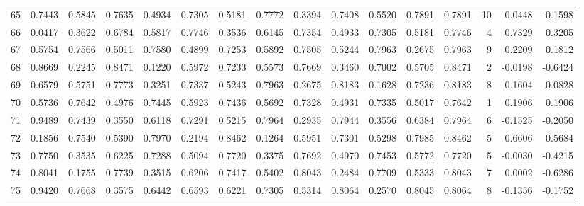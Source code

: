 \begin{tabular}{lrrrrrrrrrrrrrrr}
65  &      0.7443 &  0.5845 &  0.7635 &  0.4934 &  0.7305 &  0.5181 &  0.7772 &  0.3394 &  0.7408 &  0.5520 &   0.7891 &     0.7891 &     10 &                    0.0448 &                    -0.1598 \\
66  &      0.0417 &  0.3622 &  0.6784 &  0.5817 &  0.7746 &  0.3536 &  0.6145 &  0.7354 &  0.4933 &  0.7305 &   0.5181 &     0.7746 &      4 &                    0.7329 &                     0.3205 \\
67  &      0.5754 &  0.7566 &  0.5011 &  0.7580 &  0.4899 &  0.7253 &  0.5892 &  0.7505 &  0.5244 &  0.7963 &   0.2675 &     0.7963 &      9 &                    0.2209 &                     0.1812 \\
68  &      0.8669 &  0.2245 &  0.8471 &  0.1220 &  0.5972 &  0.7233 &  0.5573 &  0.7669 &  0.3460 &  0.7002 &   0.5705 &     0.8471 &      2 &                   -0.0198 &                    -0.6424 \\
69  &      0.6579 &  0.5751 &  0.7773 &  0.3251 &  0.7337 &  0.5243 &  0.7963 &  0.2675 &  0.8183 &  0.1628 &   0.7236 &     0.8183 &      8 &                    0.1604 &                    -0.0828 \\
70  &      0.5736 &  0.7642 &  0.4976 &  0.7445 &  0.5923 &  0.7436 &  0.5692 &  0.7328 &  0.4931 &  0.7335 &   0.5017 &     0.7642 &      1 &                    0.1906 &                     0.1906 \\
71  &      0.9489 &  0.7439 &  0.3550 &  0.6118 &  0.7291 &  0.5215 &  0.7964 &  0.2935 &  0.7944 &  0.3556 &   0.6384 &     0.7964 &      6 &                   -0.1525 &                    -0.2050 \\
72  &      0.1856 &  0.7540 &  0.5390 &  0.7970 &  0.2194 &  0.8462 &  0.1264 &  0.5951 &  0.7301 &  0.5298 &   0.7985 &     0.8462 &      5 &                    0.6606 &                     0.5684 \\
73  &      0.7750 &  0.3535 &  0.6225 &  0.7288 &  0.5094 &  0.7720 &  0.3375 &  0.7692 &  0.4970 &  0.7453 &   0.5772 &     0.7720 &      5 &                   -0.0030 &                    -0.4215 \\
74  &      0.8041 &  0.1755 &  0.7739 &  0.3515 &  0.6206 &  0.7417 &  0.5402 &  0.8043 &  0.2484 &  0.7709 &   0.5333 &     0.8043 &      7 &                    0.0002 &                    -0.6286 \\
75  &      0.9420 &  0.7668 &  0.3575 &  0.6442 &  0.6593 &  0.6221 &  0.7305 &  0.5314 &  0.8064 &  0.2570 &   0.8045 &     0.8064 &      8 &                   -0.1356 &                    -0.1752 \\

\end{tabular}
